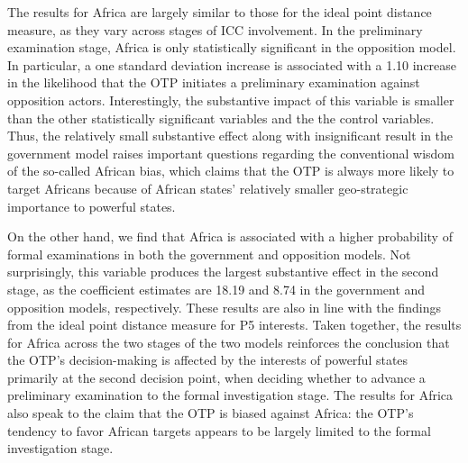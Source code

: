 The results for Africa are largely similar to those for the ideal point distance measure, as they vary across stages of ICC involvement. In the preliminary examination stage, Africa is only statistically significant in the opposition model. In particular, a one standard deviation increase is associated with a 1.10 increase in the likelihood that the OTP initiates a preliminary examination against opposition actors. Interestingly, the substantive impact of this variable is smaller than the other statistically significant variables and the the control variables. Thus, the relatively small substantive effect along with insignificant result in the government model raises important questions regarding the conventional wisdom of the so-called African bias, which claims that the OTP is always more likely to target Africans because of African states' relatively smaller geo-strategic importance to powerful states.

On the other hand, we find that Africa is associated with a higher probability of formal examinations in both the government and opposition models. Not surprisingly, this variable produces the largest substantive effect in the second stage, as the coefficient estimates are 18.19 and 8.74 in the government and opposition models, respectively. These results are also in line with the findings from the ideal point distance measure for P5 interests. Taken together, the results for Africa across the two stages of the two models reinforces the conclusion that the OTP's decision-making is affected by the interests of powerful states primarily at the second decision point, when deciding whether to advance a preliminary examination to the formal investigation stage. The results for Africa also speak to the claim that the OTP is biased against Africa: the OTP's tendency to favor African targets appears to be largely limited to the formal investigation stage.

